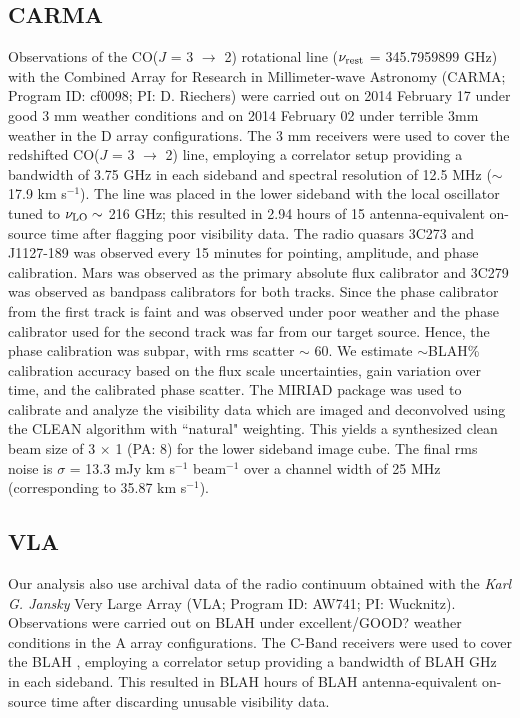 \documentclass[]{emulateapj}
\begin{document}
\subsection{CARMA} \label{sec:carmadata}
%
Observations of the CO($J$ = 3 $\rightarrow$ 2) rotational line ($\nu_{\rm
rest}$ = 345.7959899 GHz)
with the Combined Array for Research in Millimeter-wave
Astronomy (CARMA; Program ID: cf0098; PI: D. Riechers) were 
carried out on 2014 February 17
under good 3 mm weather
conditions and on 2014 February 02 under terrible 3mm weather in the D array
configurations. The 3 mm receivers were used to cover the
redshifted CO($J$ = 3 $\rightarrow$ 2) line, employing a correlator setup
providing a bandwidth of 3.75 GHz in each sideband and spectral resolution of
12.5 MHz ($\sim$17.9 km s$^{-1}$). The line was placed in the
lower sideband with the local oscillator tuned to $\nu_{\rm LO}\sim$ 216 GHz;
this resulted in 2.94 hours of 15 antenna-equivalent on-source time after
flagging poor visibility data.
The radio quasars 3C273 and J1127-189 was observed every 15 minutes for
pointing, amplitude, and phase calibration. Mars was observed as the
primary absolute flux calibrator and 3C279 was observed as bandpass calibrators for
both tracks.
Since the phase calibrator from the first track is faint and was observed under
poor weather and the phase calibrator used for the second track was
far from our target source.
Hence, the phase calibration was
subpar, with rms scatter $\sim$ 60\degr.
We estimate $\sim
$BLAH\% calibration accuracy based on the flux scale uncertainties, gain variation over time, and
the calibrated phase scatter.
The MIRIAD package was used to calibrate and analyze the visibility data which
are imaged and deconvolved using
the CLEAN algorithm with ``natural" weighting. This yields a synthesized clean
beam size of 3 $\times$ 1 (PA: 8\degr) for the lower sideband
image cube. The
final
rms noise is $\sigma$ = 13.3 mJy km s$^{-1}$ beam$^{-1}$ over a channel width
of
25 MHz (corresponding to 35.87 km s$^{-1}$).

\subsection{VLA}
Our analysis also use archival data of the radio continuum obtained with the 
{\it Karl G. Jansky} Very Large Array (VLA; Program ID: AW741; PI: Wucknitz).
Observations were carried out on BLAH under excellent/GOOD? weather
conditions in the A array configurations. The C-Band receivers were used to
cover the BLAH , employing a correlator setup providing a bandwidth of BLAH GHz in each
sideband. This resulted in BLAH hours of BLAH antenna-equivalent on-source time
after discarding unusable visibility data.
\end{document}
